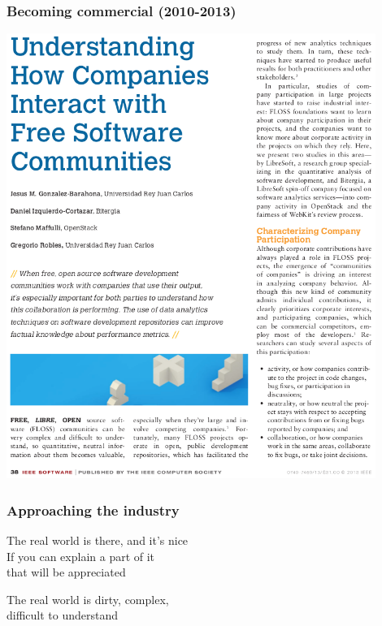 \documentclass[17pt,aspectratio=169,hyperref=pdfusetitle]{beamer}
\begin{document}
\begin{frame}[fragile]
  \frametitle{Becoming commercial (2010-2013)}

  \begin{center}
  \includegraphics[width=12cm]{figs/software-companies}
  \end{center}  
  
\end{frame}

\begin{frame}[fragile]
  \frametitle{Approaching the industry}

  The real world is there, and it's nice \\
  If you can explain a part of it \\
  that will be appreciated \\
  
  \begin{center}
    The real world is dirty, complex, \\
    difficult to understand \\
  \end{center}  
  
\end{frame}
\end{document}
